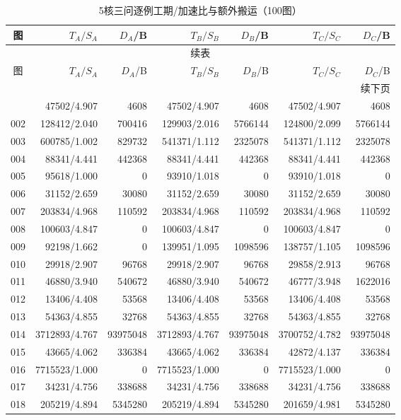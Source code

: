 \begin{longtable}{crrrrrr}
\caption{5核三问逐例工期/加速比与额外搬运（100图）}\label{tab:detail-5}\\
\toprule
图 & $T_A/S_A$ & $D_A$/B & $T_B/S_B$ & $D_B$/B & $T_C/S_C$ & $D_C$/B \\
\midrule
\endfirsthead
\multicolumn{7}{c}{续表}\\
\toprule
图 & $T_A/S_A$ & $D_A$/B & $T_B/S_B$ & $D_B$/B & $T_C/S_C$ & $D_C$/B \\
\midrule
\endhead
\midrule\multicolumn{7}{r}{续下页}\\
\endfoot
\bottomrule
\endlastfoot
001 & 47502/4.907 & 4608 & 47502/4.907 & 4608 & 47502/4.907 & 4608 \\
002 & 128412/2.040 & 700416 & 129903/2.016 & 5766144 & 124800/2.099 & 5766144 \\
003 & 600785/1.002 & 829732 & 541371/1.112 & 2325078 & 541371/1.112 & 2325078 \\
004 & 88341/4.441 & 442368 & 88341/4.441 & 442368 & 88341/4.441 & 442368 \\
005 & 95618/1.000 & 0 & 93910/1.018 & 0 & 93910/1.018 & 0 \\
006 & 31152/2.659 & 30080 & 31152/2.659 & 30080 & 31152/2.659 & 30080 \\
007 & 203834/4.968 & 110592 & 203834/4.968 & 110592 & 203834/4.968 & 110592 \\
008 & 100603/4.847 & 0 & 100603/4.847 & 0 & 100603/4.847 & 0 \\
009 & 92198/1.662 & 0 & 139951/1.095 & 1098596 & 138757/1.105 & 1098596 \\
010 & 29918/2.907 & 96768 & 29918/2.907 & 96768 & 29858/2.913 & 96768 \\
011 & 46880/3.940 & 540672 & 46880/3.940 & 540672 & 46777/3.948 & 1622016 \\
012 & 13406/4.408 & 53568 & 13406/4.408 & 53568 & 13406/4.408 & 53568 \\
013 & 54363/4.855 & 32768 & 54363/4.855 & 32768 & 54363/4.855 & 32768 \\
014 & 3712893/4.767 & 93975048 & 3712893/4.767 & 93975048 & 3700752/4.782 & 93975048 \\
015 & 43665/4.062 & 336384 & 43665/4.062 & 336384 & 42872/4.137 & 336384 \\
016 & 7715523/1.000 & 0 & 7715523/1.000 & 0 & 7715523/1.000 & 0 \\
017 & 34231/4.756 & 338688 & 34231/4.756 & 338688 & 34231/4.756 & 338688 \\
018 & 205219/4.894 & 5345280 & 205219/4.894 & 5345280 & 201659/4.981 & 5345280 \\

\end{longtable}
